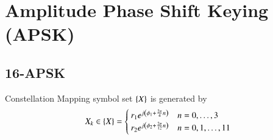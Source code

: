 \documentclass[journal,12pt,twocolumn]{IEEEtran}
\begin{document}
\section{Amplitude Phase Shift Keying (APSK)}

\subsection{16-APSK}
Constellation Mapping symbol set $\left\{X\right\}$ is generated by
\begin{equation}
X_k \in \left\{X\right\}=
\begin{cases}
r_1 e^{j\left(\phi_1+\frac{2\pi}{4}n\right)}& n=0,\dots,3\\
r_2 e^{j\left(\phi_2+\frac{2\pi}{12}n\right)}& n=0,1,\dots,11
\end{cases}
\end{equation}
\end{document}
